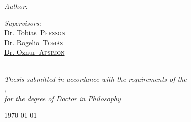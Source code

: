\documentclass[
11pt, %
english, %
singlespacing, %
headsepline, %
]{MastersDoctoralThesis} %
\begin{document}
\begin{titlepage}
\begin{center}
\vspace{1cm}

\begin{minipage}[t]{0.4\textwidth}
\begin{flushleft} \large
\emph{Author:}\\
\href{https://www.liverpool.ac.uk/quasar/the-quasars/felix-soubelet/}{\authorname} %
\end{flushleft}
\end{minipage}
\begin{minipage}[t]{0.4\textwidth}
\begin{flushright} \large
\emph{Supervisors:}\\
\href{https://www.researchgate.net/profile/Tobias-Persson}{Dr. Tobias~\textsc{Persson}}\\
\href{https://rtomas.web.cern.ch/rtomas/}{Dr. Rogelio~\textsc{Tom\'as}}\\
\href{https://www.liverpool.ac.uk/quasar/the-quasars/oznur-apsimon/}{Dr. Oznur~\textsc{Apsimon}}\\
\href{https://www.liverpool.ac.uk/quasar/the-quasars/carsten_welsch/}{\supname}\\
\end{flushright}
\end{minipage}
 
\vfill

\large \textit{Thesis submitted in accordance with the requirements of the\\}
\univname, \ \deptname \\
\large \textit{for the degree of Doctor in Philosophy}
 
\vfill

{\large \today}\\[4.5cm] %
 
\vfill
\end{center}
\end{titlepage}





\end{document}
